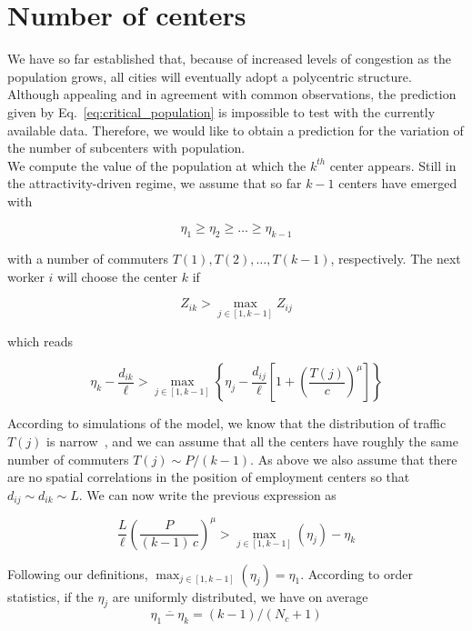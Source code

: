 \section{Number of centers}
\label{sec:number_of_centers}


We have so far established that, because of increased levels of congestion as
the population grows, all cities will eventually adopt a polycentric
structure. Although appealing and in agreement with common observations, the
prediction given by Eq.~\ref{eq:critical_population} is impossible to test with
the currently available data. Therefore, we would like to obtain a prediction
for the variation of the number of subcenters with population.\\

We compute the value of the population at which 
the $k^{th}$ center appears. Still in the attractivity-driven regime, we assume
that so far $k-1$
centers have emerged with 

$$\eta_{1} \geq \eta_{2} \geq \ldots \geq \eta_{k-1}$$

with a number of commuters $T(1), T(2), \ldots,
T(k-1)$, respectively. The next worker $i$ will choose the center $k$ if

\begin{equation}
    Z_{ik} > \max_{j \in \left[1,k-1\right]} Z_{ij}
\end{equation}

which reads

\begin{equation}
    \eta_k - \frac{d_{ik}}{\ell} > \max_{j \in \left[1,k-1\right]} \left\{
    \eta_j - \frac{d_{ij}}{\ell} \left[ 1 + \left(
      \frac{T(j)}{c}\right)^\mu\right] \right\}
\end{equation}

According to simulations of the model, we know that the distribution of traffic $T(j)$ is
narrow~\cite{Louf:2013_polycentric}, and we can assume that all the centers have roughly the same number of
commuters $T(j) \sim P/(k-1)$. As above we also assume that there are no spatial
correlations in the position of employment centers so that $d_{ij} \sim d_{ik} \sim L$. 
We can now write the previous expression as


\begin{equation}
\frac{L}{\ell} \left( \frac{P}{(k-1)\,c} \right)^{\mu} > \max_{j \in
  \left[1,k-1\right]} \left( \eta_j \right) - \eta_k
\end{equation}

Following our definitions, $\max_{j \in \left[1,k-1\right]} \left( \eta_j
\right) = \eta_1$. According to order statistics, if the $\eta_j$ are uniformly
distributed, we have on average $$\overline{\eta_1 - \eta_k} = (k-1)/(N_c+1)$$ 

